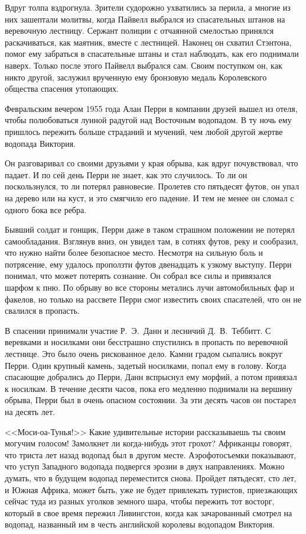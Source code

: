 \documentclass[12pt,a4paper,twoside,openany,svgnames]{memoir}
\begin{document}
Вдруг толпа вздрогнула. Зрители судорожно ухватились за перила, а многие из них зашептали молитвы, когда Пайвелл выбрался из спасательных штанов на веревочную лестницу. Сержант полиции с отчаянной смелостью принялся раскачиваться, как маятник, вместе с лестницей. Наконец он схватил Стэнтона, помог ему забраться в спасательные штаны и стал наблюдать, как его поднимали наверх. Только после этого Пайвелл выбрался сам. Своим поступком он, как никто другой, заслужил врученную ему бронзовую медаль Королевского общества спасения утопающих.

Февральским вечером 1955 года Алан Перри в компании друзей вышел из отеля, чтобы полюбоваться лунной радугой над Восточным водопадом. В ту ночь ему пришлось пережить больше страданий и мучений, чем любой другой жертве водопада Виктория.

Он разговаривал со своими друзьями у края обрыва, как вдруг почувствовал, что падает. И по сей день Перри не знает, как это случилось. То ли он поскользнулся, то ли потерял равновесие. Пролетев сто пятьдесят футов, он упал на дерево или на куст, и это смягчило его падение. И тем не менее он сломал с одного бока все ребра.

Бывший солдат и гонщик, Перри даже в таком страшном положении не потерял самообладания. Взглянув вниз, он увидел там, в сотнях футов, реку и сообразил, что нужно найти более безопасное место. Несмотря на сильную боль и потрясение, ему удалось проползти футов двенадцать к узкому выступу. Перри понимал, что может потерять сознание. Он собрал все силы и привязался шарфом к пню. По обрыву во все стороны метались лучи автомобильных фар и факелов, но только на рассвете Перри смог известить своих спасателей, что он не свалился в пропасть.

В спасении принимали участие Р.~Э.~Данн и лесничий Д.~В.~Теббитт. С веревками и носилками они бесстрашно спустились в пропасть по веревочной лестнице. Это было очень рискованное дело. Камни градом сыпались вокруг Перри. Один крупный камень, задетый носилками, попал ему в голову. Когда спасающие добрались до Перри, Данн вспрыснул ему морфий, а потом привязал к носилкам. В течение десяти часов, пока его медленно поднимали на вершину обрыва, Перри был в очень опасном состоянии. За эти десять часов он постарел на десять лет.

<<Моси-оа-Тунья!>> Какие удивительные истории рассказываешь ты своим могучим голосом! Замолкнет ли когда-нибудь этот грохот? Африканцы говорят, что триста лет назад водопад был в другом месте. Аэрофотосъемки показывают, что уступ Западного водопада подвергся эрозии в двух направлениях. Можно думать, что в будущем водопад переместится снова. Пройдет пятьдесят, сто лет, и Южная Африка, может быть, уже не будет привлекать туристов, приезжающих сейчас туда из разных уголков земного шара, чтобы пережить тот восторг, который в свое время пережил Ливингстон, когда как зачарованный смотрел на водопад, названный им в честь английской королевы водопадом Виктория.
\end{document}
